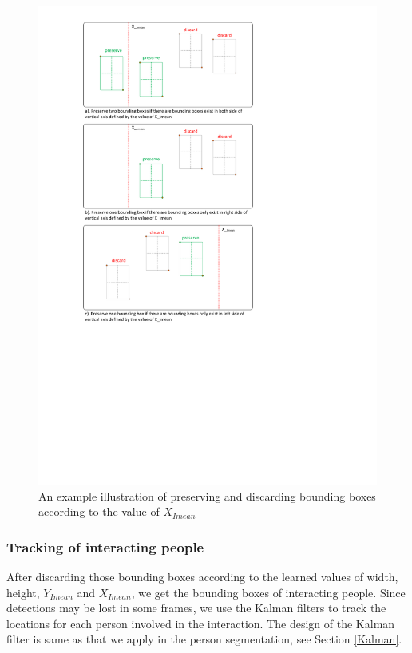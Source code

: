 \begin{figure}
	\includegraphics[trim=2cm 10cm 0cm 1cm]{fig01/x_mean.pdf}
	\caption{An example illustration of preserving and discarding bounding boxes according to the value of \(X_{Imean}\)}
	\label{fig:x_mean}
\end{figure}

\subsubsection*{Tracking of interacting people}
After discarding those bounding boxes according to the learned values of width, height, \(Y_{Imean}\) and \(X_{Imean}\), we get the bounding boxes of interacting people. Since detections may be lost in some frames, we use the Kalman filters to track the locations for each person involved in the interaction. The design of the Kalman filter is same as that we apply in the person segmentation, see Section \ref{Kalman}. 

